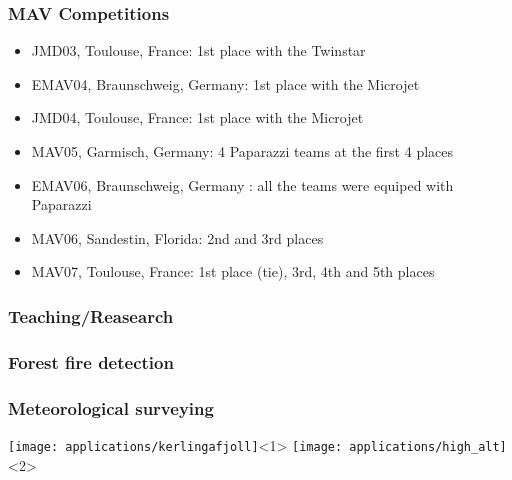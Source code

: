 \begin{frame}
  \frametitle{MAV Competitions}
    \begin{itemize}
      \item JMD03, Toulouse, France: 1st place with the Twinstar
      \item EMAV04, Braunschweig, Germany: 1st place with the Microjet
      \item JMD04, Toulouse, France: 1st place with the Microjet
      \item MAV05, Garmisch, Germany: 4 Paparazzi teams at the first 4 places
      \item EMAV06, Braunschweig, Germany : all the teams were equiped with Paparazzi
      \item MAV06, Sandestin, Florida: 2nd and 3rd places
      \item MAV07, Toulouse, France: 1st place (tie), 3rd, 4th and 5th places
    \end{itemize}
\end{frame}

\begin{frame}
  \frametitle{Teaching/Reasearch}
\end{frame}

\begin{frame}
  \frametitle{Forest fire detection}


\end{frame}


\begin{frame}
  \frametitle{Meteorological surveying}
    \begin{center}
      \texttt{[image: applications/kerlingafjoll]}<1>
      \texttt{[image: applications/high\_alt]}<2>
  \end{center}	

\end{frame}
